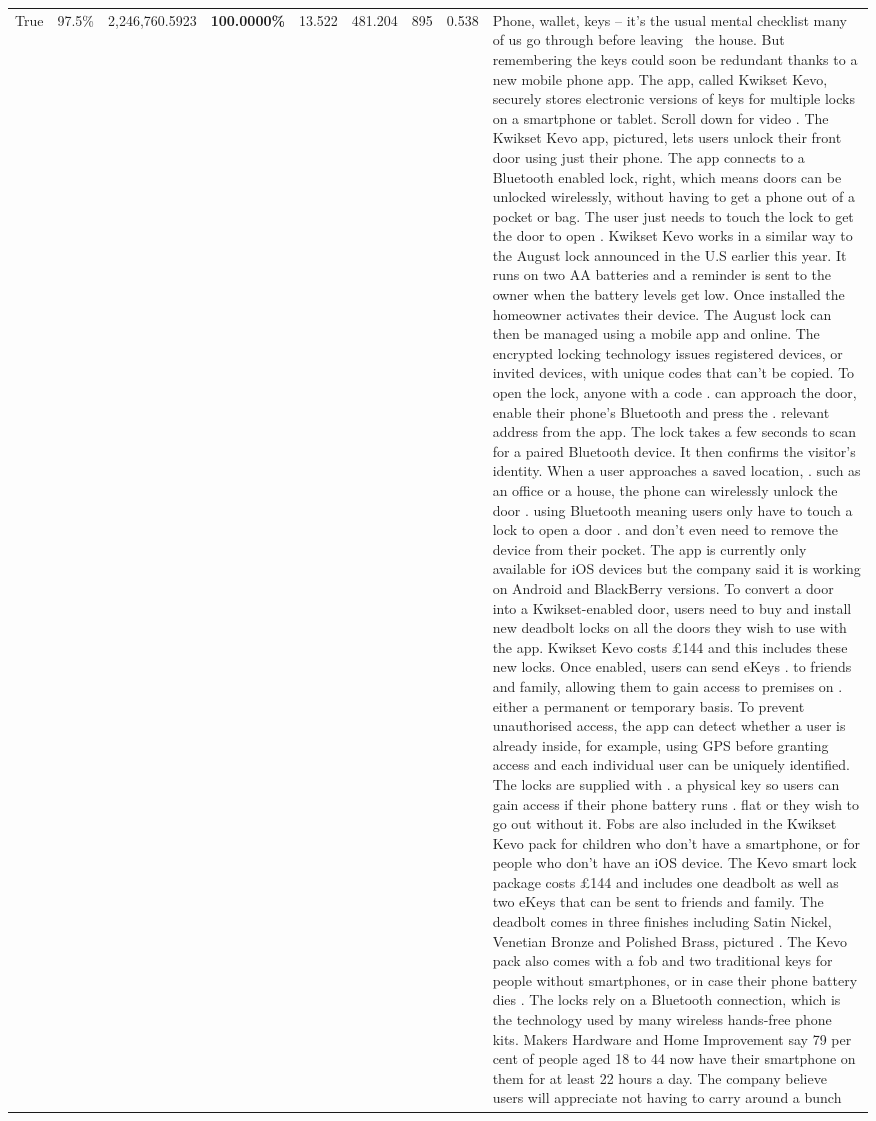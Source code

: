 \begin{table}[H]
\begin{tabular}{lllrlllll}
True & 97.5\% & 2,246,760.5923 & \bfseries \color{red} 100.0000\% & 13.522 & 481.204 & 895 & 0.538 & Phone, wallet, keys – it’s the usual mental checklist many of us go through before leaving  the house. But remembering the keys could soon be redundant thanks to a new mobile phone app. The app, called Kwikset Kevo, securely stores electronic versions of keys for multiple locks on a smartphone or tablet. Scroll down for video . The Kwikset Kevo app, pictured, lets users unlock their front door using just their phone. The app connects to a Bluetooth enabled lock, right, which means doors can be unlocked wirelessly, without having to get a phone out of a pocket or bag. The user just needs to touch the lock to get the door to open . Kwikset Kevo works in a similar way to the August lock announced in the U.S earlier this year. It runs on two AA batteries and a reminder is sent to the owner when the battery levels get low. Once installed the homeowner activates their device. The August lock can then be managed using a mobile app and online. The encrypted locking technology issues registered devices, or invited devices, with unique codes that can't be copied. To open the lock, anyone with a code . can approach the door, enable their phone's Bluetooth and press the . relevant address from the app. The lock takes a few seconds to scan for a paired Bluetooth device. It then confirms the visitor's identity. When a user approaches a saved location, . such as an office or a house, the phone can wirelessly unlock the door . using Bluetooth meaning users only have to touch a lock to open a door . and don't even need to remove the device from their pocket. The app is currently only available for iOS devices but the company said it is working on Android and BlackBerry versions. To convert a door into a Kwikset-enabled door, users need to buy and install new deadbolt locks on all the doors they wish to use with the app. Kwikset Kevo costs £144 and this includes these new locks. Once enabled, users can send eKeys . to friends and family, allowing them to gain access to premises on . either a permanent or temporary basis. To prevent unauthorised access, the app can detect whether a user is already inside, for example, using GPS before granting access and each individual user can be uniquely identified. The locks are supplied with . a physical key so users can gain access if their phone battery runs . flat or they wish to go out without it. Fobs are also included in the Kwikset Kevo pack for children who don't have a smartphone, or for people who don't have an iOS device. The Kevo smart lock package costs £144 and includes one deadbolt as well as two eKeys that can be sent to friends and family. The deadbolt comes in three finishes including Satin Nickel, Venetian Bronze and Polished Brass, pictured . The Kevo pack also comes with a fob and two traditional keys for people without smartphones, or in case their phone battery dies . The locks rely on a Bluetooth connection, which is the technology used by many wireless hands-free phone kits. Makers Hardware and Home Improvement say 79 per cent of people aged 18 to 44 now have their smartphone on them for at least 22 hours a day. The company believe users will appreciate not having to carry around a bunch 
\end{tabular}
\end{table}
